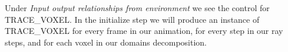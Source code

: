Under \emph{Input output relationships from environment} we see the control for TRACE\_VOXEL.  In the initialize step we will produce an instance of TRACE\_VOXEL for every frame in our animation, for every step in our ray steps, and for each voxel in our domains decomposition.

